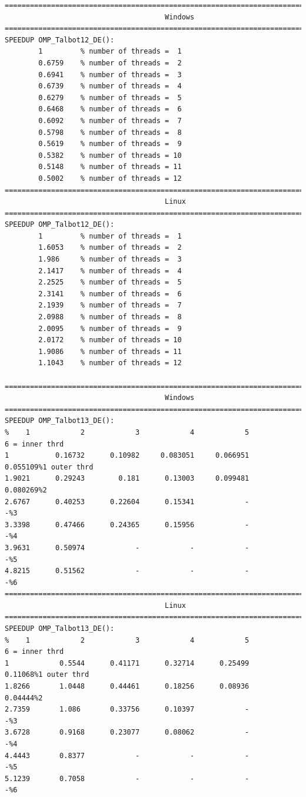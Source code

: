 \documentclass[a4paper,10pt]{report}%
\begin{document}
\begin{lstlisting}
====================================================================================
                                      Windows
====================================================================================
SPEEDUP OMP_Talbot12_DE():
        1         % number of threads =  1
        0.6759    % number of threads =  2
        0.6941    % number of threads =  3
        0.6739    % number of threads =  4
        0.6279    % number of threads =  5
        0.6468    % number of threads =  6
        0.6092    % number of threads =  7
        0.5798    % number of threads =  8
        0.5619    % number of threads =  9
        0.5382    % number of threads = 10
        0.5148    % number of threads = 11
        0.5002    % number of threads = 12
====================================================================================
                                      Linux
====================================================================================
SPEEDUP OMP_Talbot12_DE():
        1         % number of threads =  1
        1.6053    % number of threads =  2
        1.986     % number of threads =  3
        2.1417    % number of threads =  4
        2.2525    % number of threads =  5
        2.3141    % number of threads =  6
        2.1939    % number of threads =  7
        2.0988    % number of threads =  8
        2.0095    % number of threads =  9
        2.0172    % number of threads = 10
        1.9086    % number of threads = 11
        1.1043    % number of threads = 12

====================================================================================
                                      Windows
====================================================================================
SPEEDUP OMP_Talbot13_DE():
%    1            2            3            4            5            6 = inner thrd
1           0.16732      0.10982     0.083051     0.066951     0.055109%1 outer thrd
1.9021      0.29243        0.181      0.13003     0.099481     0.080269%2
2.6767      0.40253      0.22604      0.15341            -            -%3
3.3398      0.47466      0.24365      0.15956            -            -%4
3.9631      0.50974            -            -            -            -%5
4.8215      0.51562            -            -            -            -%6
====================================================================================
                                      Linux
====================================================================================
SPEEDUP OMP_Talbot13_DE():
%    1            2            3            4            5            6 = inner thrd
1            0.5544      0.41171      0.32714      0.25499      0.11068%1 outer thrd
1.8266       1.0448      0.44461      0.18256      0.08936      0.04444%2
2.7359       1.086       0.33756      0.10397            -            -%3
3.6728       0.9168      0.23077      0.08062            -            -%4
4.4443       0.8377            -            -            -            -%5
5.1239       0.7058            -            -            -            -%6
\end{lstlisting}
\end{document}

